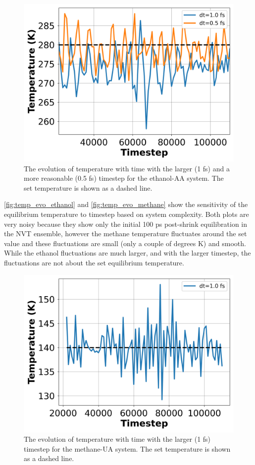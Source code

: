 \begin{figure}[h!]
    \centering
    \includegraphics[width=0.8\linewidth,keepaspectratio]{figures/rep_study/temp_evolution.png}
    \caption{The evolution of temperature with time with the larger (1 fs) and a more reasonable (0.5 fs) timestep for the ethanol-AA system. The set temperature is shown as a dashed line. }\label{fig:temp_evo_ethanol}
\end{figure}
\autoref{fig:temp_evo_ethanol} and \autoref{fig:temp_evo_methane} show the sensitivity of the equilibrium temperature to timestep based on system complexity. Both plots are very noisy because they show only the initial 100 ps post-shrink equilibration in the NVT ensemble, however the methane temperature fluctuates around the set value and these fluctuations are small (only a couple of degrees K) and smooth. While the ethanol fluctuations are much larger, and with the larger timestep, the fluctuations are not about the set equilibrium temperature.
\begin{figure}[h!]
    \centering
    \includegraphics[width=0.8\linewidth,keepaspectratio]{figures/rep_study/temp_evolution_methane.png}
    \caption{The evolution of temperature with time with the larger (1 fs) timestep for the methane-UA system. The set temperature is shown as a dashed line.}\label{fig:temp_evo_methane}
\end{figure}

